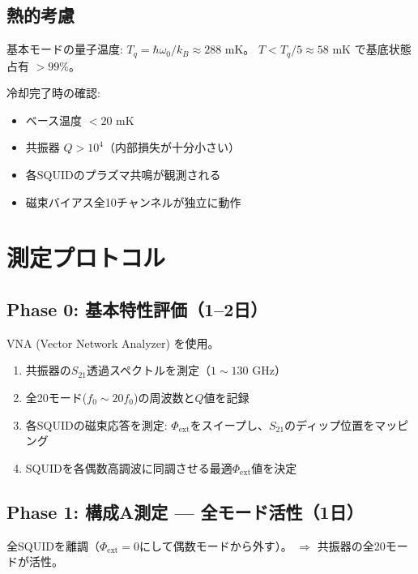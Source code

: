 \documentclass[12pt,a4paper]{article}
\begin{document}
\subsection{熱的考慮}

基本モードの量子温度: $T_q = \hbar\omega_0/k_B \approx 288$ mK。
$T < T_q/5 \approx 58$ mK で基底状態占有 $>99\%$。

\begin{checkbox}
冷却完了時の確認:
\begin{itemize}
\item[$\square$] ベース温度 $< 20$ mK
\item[$\square$] 共振器 $Q > 10^4$（内部損失が十分小さい）
\item[$\square$] 各SQUIDのプラズマ共鳴が観測される
\item[$\square$] 磁束バイアス全10チャンネルが独立に動作
\end{itemize}
\end{checkbox}

\section{測定プロトコル}

\subsection{Phase 0: 基本特性評価（1--2日）}

VNA (Vector Network Analyzer) を使用。

\begin{enumerate}
\item 共振器の$S_{21}$透過スペクトルを測定（$1 \sim 130$ GHz）
\item 全20モード($f_0 \sim 20f_0$)の周波数と$Q$値を記録
\item 各SQUIDの磁束応答を測定:
  $\Phi_{\mathrm{ext}}$をスイープし、$S_{21}$のディップ位置をマッピング
\item SQUIDを各偶数高調波に同調させる最適$\Phi_{\mathrm{ext}}$値を決定
\end{enumerate}

\subsection{Phase 1: 構成A測定 — 全モード活性（1日）}

\begin{specbox}
全SQUIDを離調（$\Phi_{\mathrm{ext}} = 0$にして偶数モードから外す）。
$\Rightarrow$ 共振器の全20モードが活性。
\end{specbox}
\end{document}
